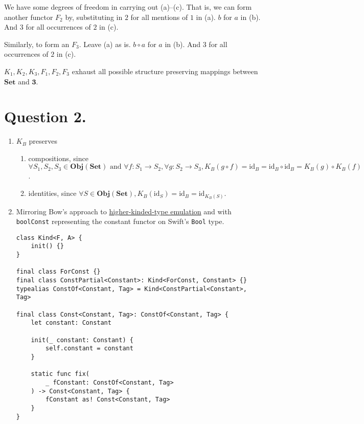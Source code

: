 \documentclass{article}
\begin{document}
We have some degrees of freedom in carrying out (a)–(c). That is, we can form another functor $F_2$ by, substituting in $2$ for all mentions of $1$ in (a). $b$ for $a$ in (b). And $3$ for all occurrences of $2$ in (c).

Similarly, to form an $F_3$. Leave (a) as is. $b \circ a$ for $a$ in (b). And $3$ for all occurrences of $2$ in (c).

$K_1, K_2, K_3, F_1, F_2, F_3$ exhaust all possible structure preserving mappings between $\textbf{Set}$ and $\textbf{3}$.

\section*{Question 2.}

\begin{enumerate}[label=(\alph*)]

\item $K_B$ preserves

\begin{enumerate}[label=-]
        \item compositions, since $\forall S_1, S_2, S_3 \in \textbf{Obj}(\textbf{Set}) \textrm{ and } \forall f: S_1 \rightarrow S_2, \forall g: S_2 \rightarrow S_3, K_B(g \circ f) = \textrm{id}_B = \textrm{id}_B \circ \textrm{id}_B = K_B(g) \circ K_B(f)$.
        \item identities, since $\forall S \in \textbf{Obj}(\textbf{Set}), K_B(\textrm{id}_S) = \textrm{id}_B = \textrm{id}_{K_B(S)}$.
    \end{enumerate}

\item Mirroring Bow’s approach to \href{https://bow-swift.io/docs/fp-concepts/higher-kinded-types/}{higher-kinded-type emulation} and with \texttt{boolConst} representing the constant functor on Swift’s \texttt{Bool} type.

\begin{verbatim}
class Kind<F, A> {
	init() {}
}

final class ForConst {}
final class ConstPartial<Constant>: Kind<ForConst, Constant> {}
typealias ConstOf<Constant, Tag> = Kind<ConstPartial<Constant>, Tag>

final class Const<Constant, Tag>: ConstOf<Constant, Tag> {
	let constant: Constant

	init(_ constant: Constant) {
		self.constant = constant
	}

	static func fix(
		_ fConstant: ConstOf<Constant, Tag>
	) -> Const<Constant, Tag> {
		fConstant as! Const<Constant, Tag>
	}
}


\end{verbatim}
\end{enumerate}
\end{document}

